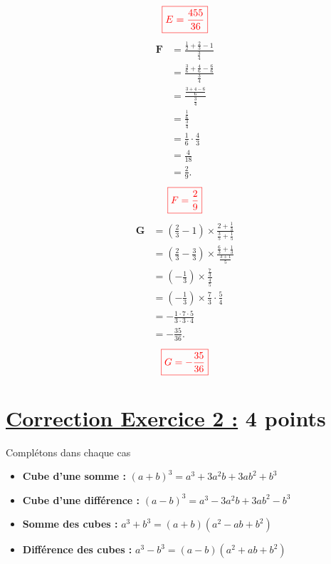 \documentclass[12pt,a4paper]{article}
\begin{document}
$$\textcolor{red}{\boxed{E=\frac{455}{36}}}$$
\begin{align*}
\textbf{F} &= \frac{\frac{1}{2} + \frac{2}{3} - 1}{\frac{3}{4}} \\ 
           &= \frac{\frac{3}{6} + \frac{4}{6} - \frac{6}{6}}{\frac{3}{4}} \\ 
           &= \frac{\frac{3 + 4 - 6}{6}}{\frac{3}{4}} \\ 
           &= \frac{\frac{1}{6}}{\frac{3}{4}} \\ 
           &= \frac{1}{6} \cdot \frac{4}{3} \\ 
           &= \frac{4}{18} \\ 
           &= \frac{2}{9}.
\end{align*}
$$\textcolor{red}{\boxed{F=\frac{2}{9}}}$$
\begin{align*}
\textbf{G} &= \left(\frac{2}{3} - 1 \right) \times \frac{2 + \frac{1}{3}}{\frac{3}{5} + \frac{1}{5}} \\ 
           &= \left(\frac{2}{3} - \frac{3}{3} \right) \times \frac{\frac{6}{3} + \frac{1}{3}}{\frac{3 + 1}{5}} \\ 
           &= \left(-\frac{1}{3} \right) \times \frac{\frac{7}{3}}{\frac{4}{5}} \\ 
           &= \left(-\frac{1}{3} \right) \times \frac{7}{3} \cdot \frac{5}{4} \\ 
           &= -\frac{1 \cdot 7 \cdot 5}{3 \cdot 3 \cdot 4} \\ 
           &= -\frac{35}{36}.
\end{align*}
$$\textcolor{red}{\boxed{G=-\frac{35}{36}}}$$
\section*{\underline{Correction Exercice 2 :} 4 points}
Complétons dans chaque cas
\begin{itemize}
    \item \textbf{Cube d'une somme :} \quad $(a + b)^3 = a^3 + 3a^2b + 3ab^2 + b^3$
    \item \textbf{Cube d'une différence :} \quad $(a - b)^3 = a^3 - 3a^2b + 3ab^2 - b^3$
    \item \textbf{Somme des cubes :} \quad $a^3 + b^3 = (a + b)(a^2 - ab + b^2)$
    \item \textbf{Différence des cubes :} \quad $a^3 - b^3 = (a - b)(a^2 + ab + b^2)$
\end{itemize}
\end{document}

